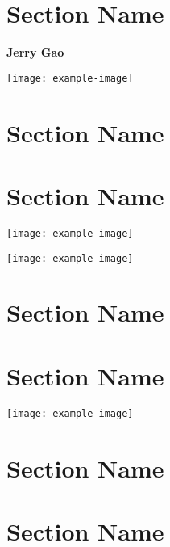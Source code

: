 \documentclass[a4paper]{article}
\newenvironment{Figure}
  {\par\medskip\noindent\minipage{\linewidth}}
  {\endminipage\par\medskip}
\newcommand{\sectionattrib}[1]{\vspace{-0.3cm}\noindent\small\textbf{#1}}
\begin{document}
    \begin{multicols}{2}
        \section{Section Name}
        \sectionattrib{Jerry Gao}
        \begin{Figure}
            \centering
            \texttt{[image: example-image]}
        \end{Figure}
        \lipsum[3-5]
        \section{Section Name}
        \lipsum[3-5]
        \section{Section Name}
        \begin{Figure}
            \centering
            \texttt{[image: example-image]}
        \end{Figure}
        \lipsum[3-5]
        \begin{Figure}
            \centering
            \texttt{[image: example-image]}
        \end{Figure}
        \section{Section Name}
        \lipsum[3-5]
        \section{Section Name}
        \lipsum[3-5]
        \begin{Figure}
            \centering
            \texttt{[image: example-image]}
        \end{Figure}
        \lipsum[3-5]
        \section{Section Name}
        \lipsum[3-5]
        \section{Section Name}
        \lipsum[3-5]                            
    \end{multicols}
    
\end{document}
